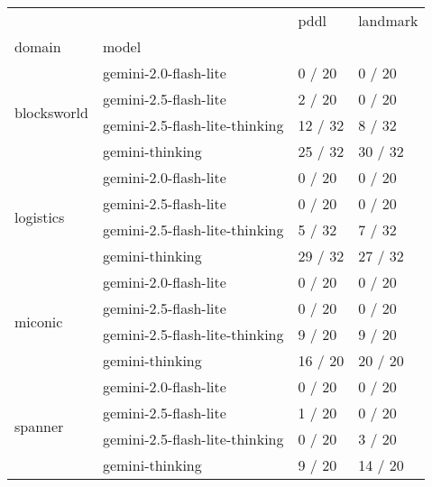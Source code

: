 \begin{tabular}{llll}
\toprule
 &  & pddl & landmark \\
domain & model &  &  \\
\midrule
\multirow[t]{4}{*}{blocksworld} & gemini-2.0-flash-lite & 0 / 20 & 0 / 20 \\
 & gemini-2.5-flash-lite & 2 / 20 & 0 / 20 \\
 & gemini-2.5-flash-lite-thinking & 12 / 32 & 8 / 32 \\
 & gemini-thinking & 25 / 32 & 30 / 32 \\
\cline{1-4}
\multirow[t]{4}{*}{logistics} & gemini-2.0-flash-lite & 0 / 20 & 0 / 20 \\
 & gemini-2.5-flash-lite & 0 / 20 & 0 / 20 \\
 & gemini-2.5-flash-lite-thinking & 5 / 32 & 7 / 32 \\
 & gemini-thinking & 29 / 32 & 27 / 32 \\
\cline{1-4}
\multirow[t]{4}{*}{miconic} & gemini-2.0-flash-lite & 0 / 20 & 0 / 20 \\
 & gemini-2.5-flash-lite & 0 / 20 & 0 / 20 \\
 & gemini-2.5-flash-lite-thinking & 9 / 20 & 9 / 20 \\
 & gemini-thinking & 16 / 20 & 20 / 20 \\
\cline{1-4}
\multirow[t]{4}{*}{spanner} & gemini-2.0-flash-lite & 0 / 20 & 0 / 20 \\
 & gemini-2.5-flash-lite & 1 / 20 & 0 / 20 \\
 & gemini-2.5-flash-lite-thinking & 0 / 20 & 3 / 20 \\
 & gemini-thinking & 9 / 20 & 14 / 20 \\
\cline{1-4}
\end{tabular}